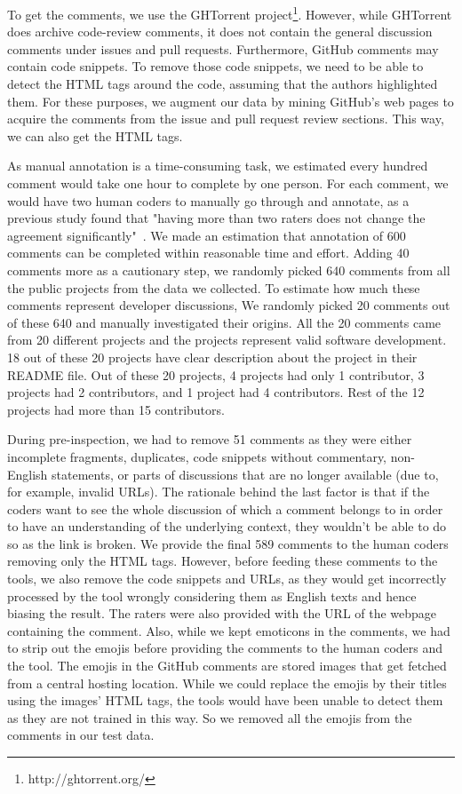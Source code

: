 To get the comments, 
we use the GHTorrent project\footnote{http://ghtorrent.org/}. However, while GHTorrent does archive code-review comments, 
it does not contain the general discussion comments 
under issues and pull requests. 
Furthermore, 
GitHub comments may contain code snippets.
To remove those code snippets, 
we need to be able to detect the HTML tags around the code, 
assuming that the authors highlighted them. 
For these purposes, 
we augment our data by mining GitHub's web pages 
to acquire the comments from the issue and pull request review sections. 
This way, we can also get the HTML tags.

As manual annotation is a time-consuming task, 
we estimated 
every hundred comment 
would take one hour to complete by one person. 
For each comment, 
we would have two human coders to 
manually go through and annotate, 
as a previous study found that 
"having more than two raters 
does not change 
the agreement significantly"~\cite{murgia2014developers}. 
We made an estimation that annotation of 600 comments 
can be completed within reasonable time and effort.
Adding 40 comments more as a cautionary step, 
we randomly picked 640 comments 
from all the public projects from the data we collected.
To estimate how much these comments
represent developer discussions,
We randomly picked 
20 comments out of these 640 
and manually investigated their origins.
All the 20 comments came from 20 different projects 
and the projects represent valid software development.
18 out of these 20 projects have clear description 
about the project in their README file.
Out of these 20 projects, 
4 projects had only 1 contributor, 
3 projects had 2 contributors, 
and 1 project had 4 contributors.
Rest of the 12 projects had more than 15 contributors.

During pre-inspection, 
we had to remove 51 comments as they were 
either incomplete fragments, 
duplicates, 
code snippets without commentary, 
non-English statements, 
or parts of discussions that are no longer available 
(due to, for example, invalid URLs). 
The rationale behind the last factor is that 
if the coders want to see the whole discussion 
of which a comment belongs to
in order to have an understanding 
of the underlying context, 
they wouldn't be able to do so as the link is broken. 
We provide the final 589 comments to the human coders 
removing only the HTML tags. 
However, before feeding these comments to the tools, 
we also remove the code snippets and URLs, 
as they would get incorrectly processed by the tool 
wrongly considering them as English texts 
and hence biasing the result. 
The raters were also provided with the URL of the webpage 
containing the comment.
Also, while we kept emoticons in the comments, 
we had to strip out the emojis 
before providing the comments 
to the human coders and the tool.
The emojis in the GitHub comments 
are stored images 
that get fetched from a central hosting location.
While we could replace the emojis 
by their titles using the images' HTML tags, 
the tools would have been unable to detect them 
as they are not trained in this way.
So we removed all the emojis 
from the comments in our test data.

